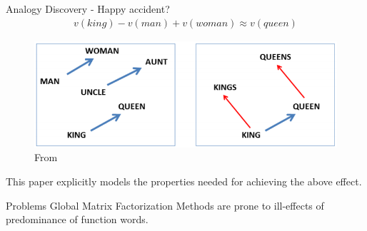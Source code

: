 \begin{frame}{Analogy Discovery - Happy accident?}
  \begin{align*}
    v(king) - v(man) + v(woman) \approx v(queen)
  \end{align*}
    \begin{figure}
      \includegraphics[scale=0.35]{images/mikolov.png}
      \caption{From}
    \end{figure}    
  This paper explicitly models the properties needed for achieving the above effect.
\end{frame}

\begin{frame}{Problems}
  Global Matrix Factorization Methods are prone to ill-effects of predominance of function words.
\end{frame}

